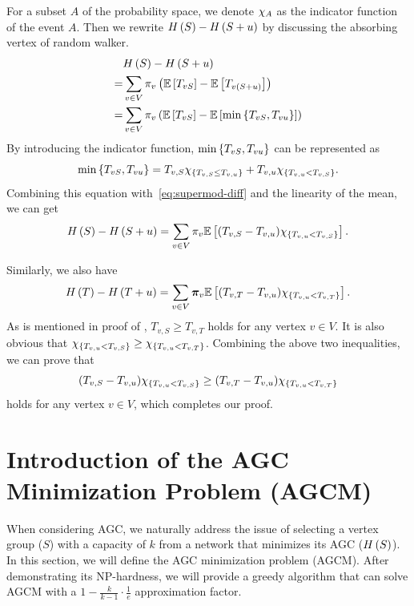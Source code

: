 \documentclass[10pt,journal,compsoc,twocolumn,twoside]{IEEEtran}
\begin{document}
\begin{IEEEproof}
    For a subset \(A\) of the probability space, we denote \(\chi_{A}\) as the indicator function of the event \(A\). Then we rewrite \(H\left(S\right)-H\left(S+u\right)\) by discussing the absorbing vertex of random walker.
    \begin{equation}\label{eq:supermod-diff}
        \begin{split}
            &H\left(S\right)-H\left(S+u\right)\\
            =&\sum_{v\in V}\pi_v\left( \mathbb{E}\left[T_{vS}\right]-\mathbb{E}\left[T_{v\left( S+u \right)}\right] \right)\\
            =&\sum_{v\in V}\pi_v\left( \mathbb{E}\left[T_{vS}\right]-\mathbb{E}\left[\min\left\{T_{vS},T_{vu} \right\}\right] \right)
        \end{split}
    \end{equation}
    By introducing the indicator function, \(\min\left\{T_{vS},T_{vu} \right\}\) can be represented as
    \begin{equation*}
        \min\left\{T_{vS},T_{vu} \right\}=T_{v,S}\chi_{\left\{T_{v,S}\le T_{v,u} \right\}}+T_{v,u}\chi_{\left\{T_{v,u}<T_{v,S} \right\}}.
    \end{equation*}
    Combining this equation with~\eqref{eq:supermod-diff} and the linearity of the mean, we can get
    \begin{equation*}
        H\left(S\right)-H\left(S+u\right)=\sum_{v\in V}\pi_v\mathbb{E}\left[(T_{v,S}-T_{v,u})\chi_{\left\{T_{v,u}<T_{v,S} \right\}}\right].
    \end{equation*}

    Similarly, we also have
    \[H\left(T\right)-H\left(T+u\right)=\sum_{v\in V}\boldsymbol{\pi}_v\mathbb{E}\left[(T_{v,T}-T_{v,u})\chi_{\left\{T_{v,u}<T_{v,T} \right\}}\right].\]
    As is mentioned in proof of , \(T_{v,S}\ge T_{v,T}\) holds for any vertex \(v\in V\).
    It is also obvious that \(\chi_{\left\{T_{v,u}<T_{v,S} \right\}}\ge\chi_{\left\{T_{v,u}<T_{v,T} \right\}}\).
    Combining the above two inequalities, we can prove that
    \[(T_{v,S}-T_{v,u})\chi_{\left\{T_{v,u}<T_{v,S} \right\}}\ge(T_{v,T}-T_{v,u})\chi_{\left\{T_{v,u}<T_{v,T} \right\}}\]
    holds for any vertex \(v\in V\), which completes our proof.
\end{IEEEproof}

\section{Introduction of the AGC Minimization Problem (AGCM)}

When considering AGC, we naturally address the issue of selecting a vertex group (\(S\)) with a capacity of \(k\) from a network that minimizes its AGC (\(H\left(S\right)\)).
In this section, we will define the AGC minimization problem (AGCM).
After demonstrating its NP-hardness, we will provide a greedy algorithm that can solve AGCM with a \(1-\frac{k}{k-1}\cdot\frac{1}{e}\) approximation factor.
\end{document}
